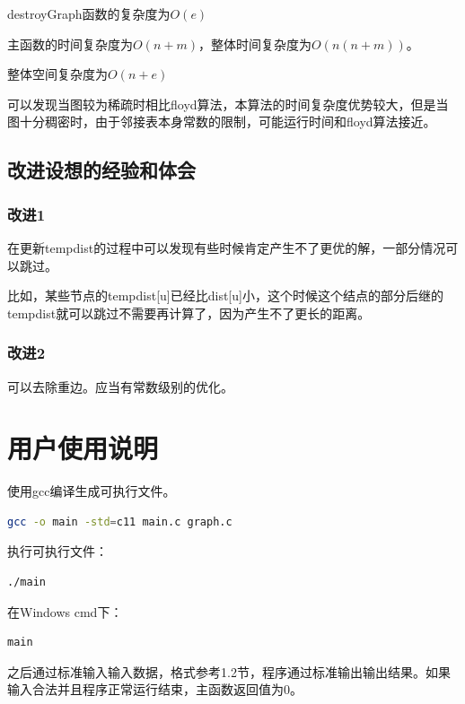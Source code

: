 \documentclass{article}
\begin{document}
destroyGraph函数的复杂度为$O(e)$

主函数的时间复杂度为$O(n+m)$，整体时间复杂度为$O(n(n+m))$。

整体空间复杂度为$O(n+e)$

可以发现当图较为稀疏时相比floyd算法，本算法的时间复杂度优势较大，但是当图十分稠密时，由于邻接表本身常数的限制，可能运行时间和floyd算法接近。

\subsection{改进设想的经验和体会}

\subsubsection{改进1}

在更新tempdist的过程中可以发现有些时候肯定产生不了更优的解，一部分情况可以跳过。

比如，某些节点的tempdist[u]已经比dist[u]小，这个时候这个结点的部分后继的tempdist就可以跳过不需要再计算了，因为产生不了更长的距离。

\subsubsection{改进2}

可以去除重边。应当有常数级别的优化。

\section{用户使用说明}

使用gcc编译生成可执行文件。

\begin{lstlisting}[language={bash},
    basicstyle=\small\consolas]
gcc -o main -std=c11 main.c graph.c
\end{lstlisting}

执行可执行文件：

\begin{lstlisting}[language={bash},
    basicstyle=\small\consolas]
./main
\end{lstlisting}

在Windows cmd下：

\begin{lstlisting}[language={bash},
    basicstyle=\small\consolas]
main
\end{lstlisting}

之后通过标准输入输入数据，格式参考1.2节，程序通过标准输出输出结果。如果输入合法并且程序正常运行结束，主函数返回值为0。
\end{document}
